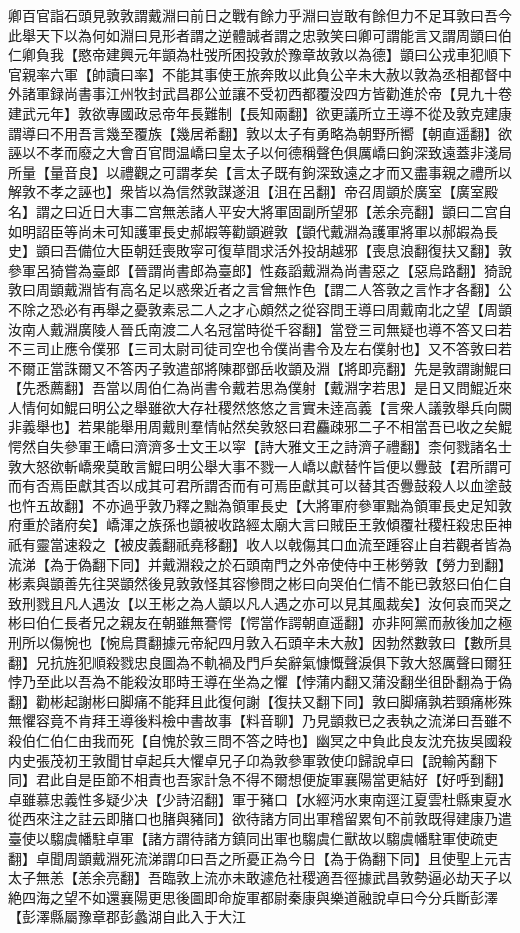 卿百官詣石頭見敦敦謂戴淵曰前日之戰有餘力乎淵曰豈敢有餘但力不足耳敦曰吾今此舉天下以為何如淵曰見形者謂之逆體誠者謂之忠敦笑曰卿可謂能言又謂周顗曰伯仁卿負我【愍帝建興元年顗為杜弢所困投敦於豫章故敦以為德】顗曰公戎車犯順下官親率六軍【帥讀曰率】不能其事使王旅奔敗以此負公辛未大赦以敦為丞相都督中外諸軍録尚書事江州牧封武昌郡公並讓不受初西都覆没四方皆勸進於帝【見九十卷建武元年】敦欲專國政忌帝年長難制【長知兩翻】欲更議所立王導不從及敦克建康謂導曰不用吾言幾至覆族【幾居希翻】敦以太子有勇略為朝野所嚮【朝直遥翻】欲誣以不孝而廢之大會百官問温嶠曰皇太子以何德稱聲色俱厲嶠曰鉤深致遠蓋非淺局所量【量音良】以禮觀之可謂孝矣【言太子既有鉤深致遠之才而又盡事親之禮所以解敦不孝之誣也】衆皆以為信然敦謀遂沮【沮在呂翻】帝召周顗於廣室【廣室殿名】謂之曰近日大事二宫無恙諸人平安大將軍固副所望邪【恙余亮翻】顗曰二宫自如明詔臣等尚未可知護軍長史郝嘏等勸顗避敦【顗代戴淵為護軍將軍以郝嘏為長史】顗曰吾備位大臣朝廷喪敗寜可復草間求活外投胡越邪【喪息浪翻復扶又翻】敦參軍呂猗嘗為臺郎【晉謂尚書郎為臺郎】性姦謟戴淵為尚書惡之【惡烏路翻】猗說敦曰周顗戴淵皆有高名足以惑衆近者之言曾無怍色【謂二人答敦之言怍才各翻】公不除之恐必有再舉之憂敦素忌二人之才心頗然之從容問王導曰周戴南北之望【周顗汝南人戴淵廣陵人晉氏南渡二人名冠當時從千容翻】當登三司無疑也導不答又曰若不三司止應令僕邪【三司太尉司徒司空也令僕尚書令及左右僕射也】又不答敦曰若不爾正當誅爾又不答丙子敦遣部將陳郡鄧岳收顗及淵【將即亮翻】先是敦謂謝鯤曰【先悉薦翻】吾當以周伯仁為尚書令戴若思為僕射【戴淵字若思】是日又問鯤近來人情何如鯤曰明公之舉雖欲大存社稷然悠悠之言實未逹高義【言衆人議敦舉兵向闕非義舉也】若果能舉用周戴則羣情帖然矣敦怒曰君麤疎邪二子不相當吾已收之矣鯤愕然自失參軍王嶠曰濟濟多士文王以寜【詩大雅文王之詩濟子禮翻】柰何戮諸名士敦大怒欲斬嶠衆莫敢言鯤曰明公舉大事不戮一人嶠以獻替忤旨便以釁鼓【君所謂可而有否焉臣獻其否以成其可君所謂否而有可焉臣獻其可以替其否釁鼓殺人以血塗鼓也忤五故翻】不亦過乎敦乃釋之黜為領軍長史【大將軍府參軍黜為領軍長史足知敦府重於諸府矣】嶠渾之族孫也顗被收路經太廟大言曰賊臣王敦傾覆社稷枉殺忠臣神祇有靈當速殺之【被皮義翻祇堯移翻】收人以戟傷其口血流至踵容止自若觀者皆為流涕【為于偽翻下同】并戴淵殺之於石頭南門之外帝使侍中王彬勞敦【勞力到翻】彬素與顗善先往哭顗然後見敦敦怪其容慘問之彬曰向哭伯仁情不能已敦怒曰伯仁自致刑戮且凡人遇汝【以王彬之為人顗以凡人遇之亦可以見其風裁矣】汝何哀而哭之彬曰伯仁長者兄之親友在朝雖無謇愕【愕當作諤朝直遥翻】亦非阿黨而赦後加之極刑所以傷惋也【惋烏貫翻據元帝紀四月敦入石頭辛未大赦】因勃然數敦曰【數所具翻】兄抗旌犯順殺戮忠良圖為不軌禍及門戶矣辭氣慷慨聲淚俱下敦大怒厲聲曰爾狂悖乃至此以吾為不能殺汝耶時王導在坐為之懼【悖蒲内翻又蒲没翻坐徂卧翻為于偽翻】勸彬起謝彬曰脚痛不能拜且此復何謝【復扶又翻下同】敦曰脚痛孰若頸痛彬殊無懼容竟不肯拜王導後料檢中書故事【料音聊】乃見顗救已之表執之流涕曰吾雖不殺伯仁伯仁由我而死【自愧於敦三問不答之時也】幽冥之中負此良友沈充抜吳國殺内史張茂初王敦聞甘卓起兵大懼卓兄子卬為敦參軍敦使卬歸說卓曰【說輸芮翻下同】君此自是臣節不相責也吾家計急不得不爾想便旋軍襄陽當更結好【好呼到翻】卓雖慕忠義性多疑少决【少詩沼翻】軍于豬口【水經沔水東南逕江夏雲杜縣東夏水從西來注之註云即䐗口也䐗與豬同】欲待諸方同出軍稽留累旬不前敦既得建康乃遣臺使以騶虞幡駐卓軍【諸方謂待諸方鎮同出軍也騶虞仁獸故以騶虞幡駐軍使疏吏翻】卓聞周顗戴淵死流涕謂卬曰吾之所憂正為今日【為于偽翻下同】且使聖上元吉太子無恙【恙余亮翻】吾臨敦上流亦未敢遽危社稷適吾徑據武昌敦勢逼必劫天子以絶四海之望不如還襄陽更思後圖即命旋軍都尉秦康與樂道融說卓曰今分兵斷彭澤【彭澤縣屬豫章郡彭蠡湖自此入于大江